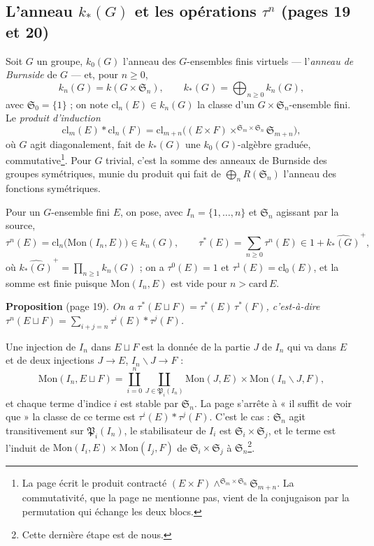 \documentclass[11pt,a4paper]{article}
\begin{document}
\subsection*{L'anneau $k_{*}(G)$ et les opérations $\tau^{n}$ (pages 19 et 20)}

Soit $G$ un groupe, $k_0(G)$ l'anneau des $G$-ensembles finis virtuels —
l'\emph{anneau de Burnside} de $G$ — et, pour $n \geqslant 0$,
\[
k_n(G) = k(G \times \mathfrak{S}_n), \qquad
k_{*}(G) = \bigoplus_{n \geqslant 0} k_n(G),
\]
avec $\mathfrak{S}_0 = \{1\}$ ; on note $\mathrm{cl}_n(E) \in k_n(G)$ la
classe d'un $G \times \mathfrak{S}_n$-ensemble fini. Le \emph{produit
d'induction}
\[
\mathrm{cl}_m(E) * \mathrm{cl}_n(F) = \mathrm{cl}_{m+n}\bigl((E \times F)
\times^{\mathfrak{S}_m \times \mathfrak{S}_n} \mathfrak{S}_{m+n}\bigr),
\]
où $G$ agit diagonalement, fait de $k_{*}(G)$ une $k_0(G)$-algèbre graduée,
commutative\footnote{La page écrit le produit contracté
$(E \times F) \wedge^{\mathfrak{S}_m \times \mathfrak{S}_n}
\mathfrak{S}_{m+n}$. La commutativité, que la page ne mentionne pas, vient
de la conjugaison par la permutation qui échange les deux blocs.}. Pour
$G$ trivial, c'est la somme des anneaux de Burnside des groupes symétriques,
munie du produit qui fait de $\bigoplus_n R(\mathfrak{S}_n)$ l'anneau des
fonctions symétriques.

Pour un $G$-ensemble fini $E$, on pose, avec $I_n = \{1, \dots, n\}$ et
$\mathfrak{S}_n$ agissant par la source,
\[
\tau^{n}(E) = \mathrm{cl}_n\bigl(\mathrm{Mon}(I_n, E)\bigr) \in k_n(G),
\qquad
\tau^{*}(E) = \sum_{n \geqslant 0} \tau^{n}(E) \in 1 +
\widehat{k_{*}(G)}^{+},
\]
où $\widehat{k_{*}(G)}^{+} = \prod_{n \geqslant 1} k_n(G)$ ; on a
$\tau^{0}(E) = 1$ et $\tau^{1}(E) = \mathrm{cl}_0(E)$, et la somme est finie
puisque $\mathrm{Mon}(I_n, E)$ est vide pour $n > \mathrm{card}\,E$.

\textbf{Proposition} (page 19). \emph{On a $\tau^{*}(E \sqcup F) =
\tau^{*}(E)\,\tau^{*}(F)$, c'est-à-dire $\tau^{n}(E \sqcup F) =
\sum_{i+j=n} \tau^{i}(E) * \tau^{j}(F)$.}

Une injection de $I_n$ dans $E \sqcup F$ est la donnée de la partie $J$ de
$I_n$ qui va dans $E$ et de deux injections $J \to E$,
$I_n \smallsetminus J \to F$ :
\[
\mathrm{Mon}(I_n, E \sqcup F) = \coprod_{i = 0}^{n}
\coprod_{J \in \mathfrak{P}_i(I_n)} \mathrm{Mon}(J, E) \times
\mathrm{Mon}(I_n \smallsetminus J, F),
\]
et chaque terme d'indice $i$ est stable par $\mathfrak{S}_n$. La page s'arrête
à « il suffit de voir que » la classe de ce terme est $\tau^{i}(E) *
\tau^{j}(F)$. C'est le cas : $\mathfrak{S}_n$ agit transitivement sur
$\mathfrak{P}_i(I_n)$, le stabilisateur de $I_i$ est $\mathfrak{S}_i \times
\mathfrak{S}_j$, et le terme est l'induit de $\mathrm{Mon}(I_i, E) \times
\mathrm{Mon}(I_j, F)$ de $\mathfrak{S}_i \times \mathfrak{S}_j$ à
$\mathfrak{S}_n$\footnote{Cette dernière étape est de nous.}.
\end{document}
